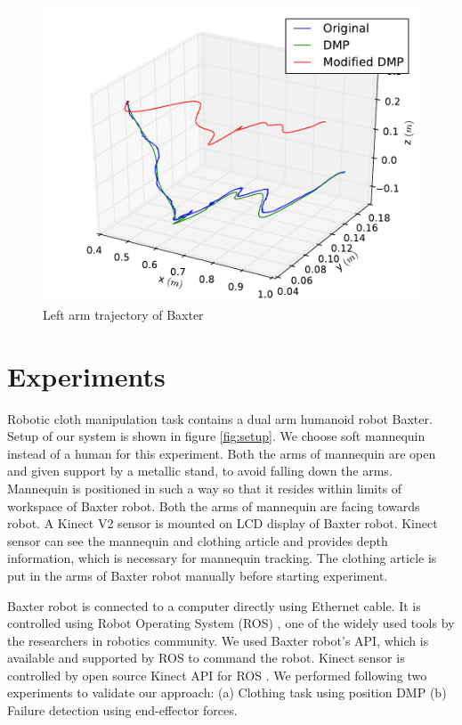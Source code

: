 \documentclass[sigconf]{acmart}
\begin{document}
\begin{figure}
	\includegraphics[width=\linewidth]{all_traj}
	\caption{Left arm trajectory of Baxter}
	\label{fig:trajectory}
\end{figure}

\section{Experiments}
\label{sec:experiments}
Robotic cloth manipulation task contains a dual arm humanoid robot Baxter. Setup of our system is shown in figure \ref{fig:setup}. We choose soft mannequin instead of a human for this experiment. Both the arms of mannequin are open and given support by a metallic stand, to avoid falling down the arms. Mannequin is positioned in such a way so that it resides within limits of workspace of Baxter robot. Both the arms of mannequin are facing towards robot. A Kinect V2 \cite{microsoft2014kinect} sensor is mounted on LCD display of Baxter robot. Kinect sensor can see the mannequin and clothing article and provides depth information, which is necessary for mannequin tracking. The clothing article is put in the arms of Baxter robot manually before starting experiment.

Baxter robot is connected to a computer directly using Ethernet cable. It is controlled using Robot Operating System (ROS) \cite{quigley2009ros}, one of the widely used tools by the researchers in robotics community. We used Baxter robot's API, which is available and supported by ROS to command the robot. Kinect sensor is controlled by open source Kinect API for ROS \cite{iai_kinect2, libfreenect2}. We performed following two experiments to validate our approach: (a) Clothing task using position DMP (b) Failure detection using end-effector forces.
\end{document}

